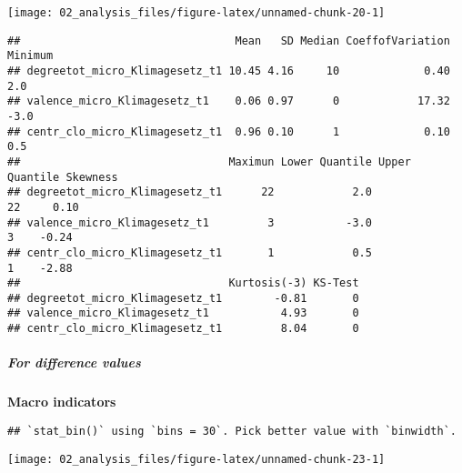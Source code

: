\documentclass[
]{article}
\begin{document}
\begin{center}\texttt{[image: 02\_analysis\_files/figure-latex/unnamed-chunk-20-1]} \end{center}

\begin{verbatim}
##                                 Mean   SD Median CoeffofVariation Minimum
## degreetot_micro_Klimagesetz_t1 10.45 4.16     10             0.40     2.0
## valence_micro_Klimagesetz_t1    0.06 0.97      0            17.32    -3.0
## centr_clo_micro_Klimagesetz_t1  0.96 0.10      1             0.10     0.5
##                                Maximun Lower Quantile Upper Quantile Skewness
## degreetot_micro_Klimagesetz_t1      22            2.0             22     0.10
## valence_micro_Klimagesetz_t1         3           -3.0              3    -0.24
## centr_clo_micro_Klimagesetz_t1       1            0.5              1    -2.88
##                                Kurtosis(-3) KS-Test
## degreetot_micro_Klimagesetz_t1        -0.81       0
## valence_micro_Klimagesetz_t1           4.93       0
## centr_clo_micro_Klimagesetz_t1         8.04       0
\end{verbatim}

\hypertarget{for-difference-values}{%
\subparagraph{For difference values}\label{for-difference-values}}

\textbf{Macro indicators}

\begin{verbatim}
## `stat_bin()` using `bins = 30`. Pick better value with `binwidth`.
\end{verbatim}

\begin{center}\texttt{[image: 02\_analysis\_files/figure-latex/unnamed-chunk-23-1]} \end{center}
\end{document}

